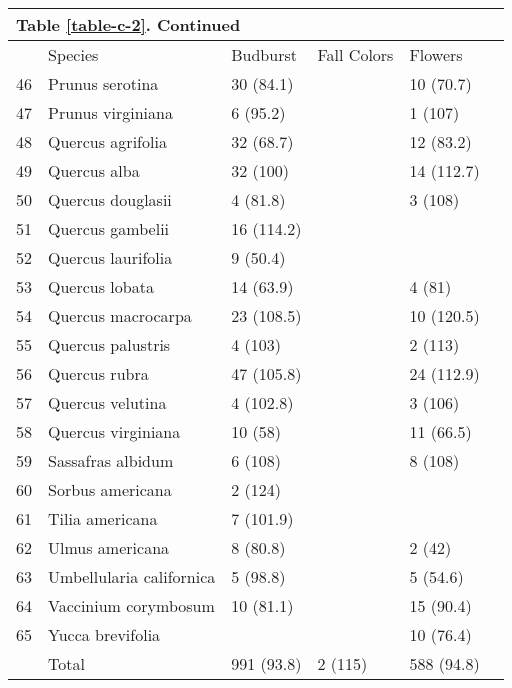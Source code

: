\begin{table}
\begin{tabularx}{\textwidth}{p{0.5cm}XXXXX}
\multicolumn{3}{l}{Table \ref{table-c-2}. Continued}\\
\hline
& Species & Budburst & Fall Colors & Flowers\\
\hline

46 & Prunus serotina & 30 (84.1) &  & 10 (70.7) \\ 
47 & Prunus virginiana & 6 (95.2) &  & 1 (107) \\ 
48 & Quercus agrifolia & 32 (68.7) &  & 12 (83.2) \\ 
49 & Quercus alba & 32 (100) &  & 14 (112.7) \\ 
50 & Quercus douglasii & 4 (81.8) &  & 3 (108) \\ 
51 & Quercus gambelii & 16 (114.2) &  &  \\ 
52 & Quercus laurifolia & 9 (50.4) &  &  \\ 
53 & Quercus lobata & 14 (63.9) &  & 4 (81) \\ 
54 & Quercus macrocarpa & 23 (108.5) &  & 10 (120.5) \\ 
55 & Quercus palustris & 4 (103) &  & 2 (113) \\ 
56 & Quercus rubra & 47 (105.8) &  & 24 (112.9) \\ 
57 & Quercus velutina & 4 (102.8) &  & 3 (106) \\ 
58 & Quercus virginiana & 10 (58) &  & 11 (66.5) \\ 
59 & Sassafras albidum & 6 (108) &  & 8 (108) \\ 
60 & Sorbus americana & 2 (124) &  &  \\ 
61 & Tilia americana & 7 (101.9) &  &  \\ 
62 & Ulmus americana & 8 (80.8) &  & 2 (42) \\ 
63 & Umbellularia californica & 5 (98.8) &  & 5 (54.6) \\ 
64 & Vaccinium corymbosum & 10 (81.1) &  & 15 (90.4) \\ 
65 & Yucca brevifolia &  &  & 10 (76.4) \\ 
 & Total & 991 (93.8) & 2 (115) & 588 (94.8) \\ 
 
\hline
\end{tabularx}
\end{table}